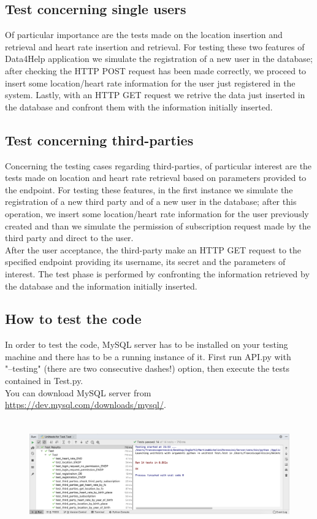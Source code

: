 \documentclass{article}
\begin{document}
\subsection{Test concerning single users}
Of particular importance are the tests made on the location insertion and retrieval and heart rate insertion and retrieval.
For testing these two features of Data4Help application we simulate the registration of a new user in the database; after checking the HTTP POST request has been made correctly, we proceed to insert some location/heart rate information for the user just registered in the system. Lastly, with an HTTP GET request we retrive the data just inserted in the database and confront them with the information initially inserted.

\subsection{Test concerning third-parties}
Concerning the testing cases regarding third-parties, of particular interest are the tests made on location and heart rate retrieval based on parameters provided to the endpoint.
For testing these features, in the first instance we simulate the registration of a new third party and of a new user in the database; after this operation, we insert some location/heart rate information for the user previously created and than we simulate the permission of subscription request made by the third party and direct to the user. \\
After the user acceptance, the third-party make an HTTP GET request to the specified endpoint providing its username, its secret and the parameters of interest.
The test phase is performed by confronting the information retrieved by the database and the information initially inserted.  
\newpage
\subsection{How to test the code}

In order to test the code, MySQL server has to be installed on your testing machine and there has to be a running instance of it.
First run API.py with \\"--testing" (there are two consecutive dashes!) option, then execute the tests contained in Test.py.\\
You can download MySQL server from \\ \url{https://dev.mysql.com/downloads/mysql/}.

\begin{figure}[h!]
\centering
	\includegraphics[height=4.7cm,keepaspectratio]{Figures/tests}
\end{figure}
\end{document}
